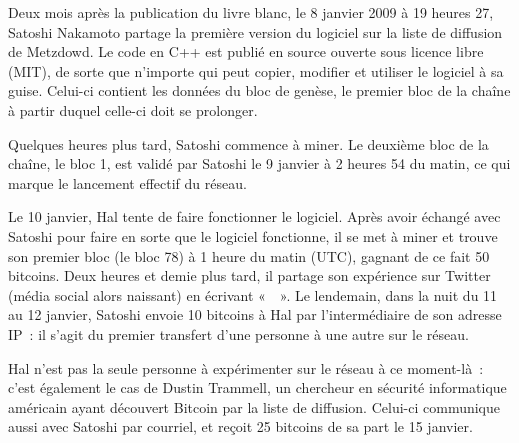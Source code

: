 
Deux mois après la publication du livre blanc, le 8 janvier 2009 à 19 heures 27, Satoshi Nakamoto partage la première version du logiciel sur la liste de diffusion de Metzdowd. Le code en C++ est publié en source ouverte sous licence libre (MIT), de sorte que n'importe qui peut copier, modifier et utiliser le logiciel à sa guise. Celui-ci contient les données du bloc de genèse, le premier bloc de la chaîne à partir duquel celle-ci doit se prolonger.

Quelques heures plus tard, Satoshi commence à miner. Le deuxième bloc de la chaîne, le bloc 1, est validé par Satoshi le 9 janvier à 2 heures 54 du matin, ce qui marque le lancement effectif du réseau.

Le 10 janvier, Hal tente de faire fonctionner le logiciel. Après avoir échangé avec Satoshi pour faire en sorte que le logiciel fonctionne, il se met à miner et trouve son premier bloc (le bloc 78) à 1 heure du matin (UTC), gagnant de ce fait 50 bitcoins. Deux heures et demie plus tard, il partage son expérience sur Twitter (média social alors naissant) en écrivant «~~». Le lendemain, dans la nuit du 11 au 12 janvier, Satoshi envoie 10 bitcoins à Hal par l'intermédiaire de son adresse IP~: il s'agit du premier transfert d'une personne à une autre sur le réseau.

Hal n'est pas la seule personne à expérimenter sur le réseau à ce moment-là~: c'est également le cas de Dustin Trammell, un chercheur en sécurité informatique américain ayant découvert Bitcoin par la liste de diffusion. Celui-ci communique aussi avec Satoshi par courriel, et reçoit 25 bitcoins de sa part le 15 janvier.

